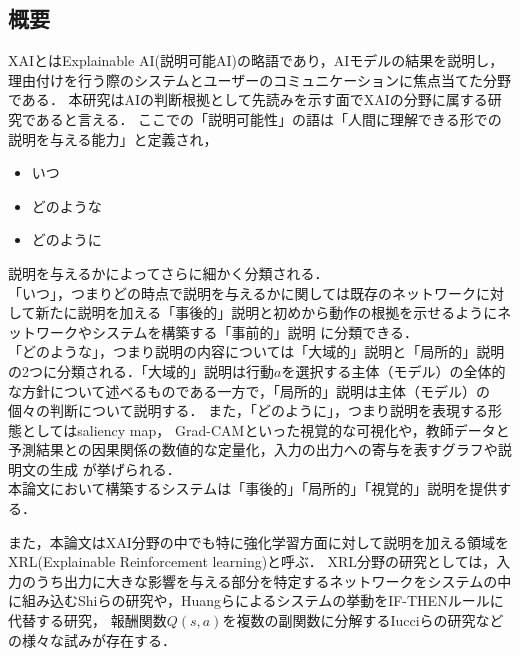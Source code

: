 \subsection{概要}
XAIとはExplainable AI(説明可能AI)の略語であり，AIモデルの結果を説明し，理由付けを行う際のシステムとユーザーのコミュニケーションに焦点当てた分野である\cite{consider}．
本研究はAIの判断根拠として先読みを示す面でXAIの分野に属する研究であると言える．
ここでの「説明可能性」の語は「人間に理解できる形での説明を与える能力」\cite{definition}と定義され，
\begin{itemize}
    \item いつ
    \item どのような
    \item どのように
\end{itemize}
説明を与えるかによってさらに細かく分類される．\\
「いつ」，つまりどの時点で説明を与えるかに関しては既存のネットワークに対して新たに説明を加える「事後的」説明と初めから動作の根拠を示せるようにネットワークやシステムを構築する「事前的」説明
に分類できる\cite{definition}．\\
「どのような」，つまり説明の内容については「大域的」説明と「局所的」説明の2つに分類される．「大域的」説明は行動$a$を選択する主体（モデル）の全体的な方針について述べるものである一方で，「局所的」説明は主体（モデル）の個々の判断について説明する\cite{gl}．
また，「どのように」，つまり説明を表現する形態としてはsaliency map\cite{saliency}， Grad-CAM\cite{Grad-CAM}といった視覚的な可視化や，教師データと予測結果との因果関係の数値的な定量化\cite{定量}，入力の出力への寄与を表すグラフや説明文の生成\cite{LIME}
が挙げられる．\\
本論文において構築するシステムは「事後的」「局所的」「視覚的」説明を提供する．

また，本論文はXAI分野の中でも特に強化学習方面に対して説明を加える領域をXRL(Explainable Reinforcement learning)と呼ぶ\cite{XRL}．
XRL分野の研究としては，入力のうち出力に大きな影響を与える部分を特定するネットワークをシステムの中に組み込むShiらの研究\cite{DBLP:journals/corr/abs-2003-07069}や，Huangらによるシステムの挙動をIF-THENルールに代替する研究\cite{Huang2020InterpretablePF}， 報酬関数$Q(s, a)$を複数の副関数に分解するIucciらの研究\cite{9659472}などの様々な試みが存在する．



